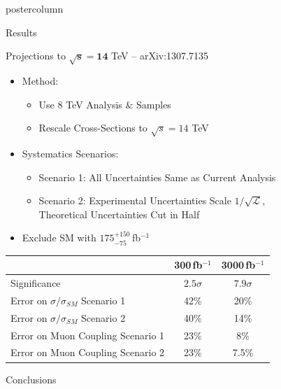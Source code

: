 \documentclass[final,hyperref={pdfpagelabels=false}]{beamer}
\newcommand{\fb}{\,fb$^{-1}$}
\begin{document}
\begin{frame}
\begin{columns}
\begin{column}{.49\textwidth}
\begin{beamercolorbox}[center,wd=\textwidth]{postercolumn}
\begin{minipage}[T]{.95\textwidth}
{\begin{block}{Results}
            \end{block}
            \vfill
            \begin{block}{Projections to $\mathbf{\sqrt{s}=14}$ TeV -- arXiv:1307.7135 }
               \begin{itemize} 
                  \item Method:
                  \begin{itemize} 
                    \item Use 8 TeV Analysis \& Samples 
                    \item Rescale Cross-Sections to $\sqrt{s}=14$ TeV
                  \end{itemize}
                  \item Systematics Scenarios:
                  \begin{itemize}
                    \item Scenario 1: All Uncertainties Same as Current Analysis
                    \item Scenario 2: Experimental Uncertainties Scale $1/\sqrt{\mathcal{L}}$, \\
                                      Theoretical Uncertainties Cut in Half
                  \end{itemize}
                  \item Exclude SM with $175^{+150}_{-75}$\fb
               \end{itemize}
               \begin{center}
                      \begin{tabular}{|l|c|c|} \hline
                          & 300\fb & 3000\fb \\ \hline
                        Significance  & $2.5\sigma$ & $7.9\sigma$ \\ \hline
                        Error on $\sigma/\sigma_{SM}$ Scenario 1  & 42\% & 20\% \\ \hline
                        Error on $\sigma/\sigma_{SM}$ Scenario 2  & 40\% & 14\% \\ \hline
                        Error on Muon Coupling Scenario 1  & 23\% & 8\% \\ \hline
                        Error on Muon Coupling Scenario 2  & 23\% & 7.5\% \\ \hline
                      \end{tabular}
               \end{center}
            \end{block}
            \vfill
            \begin{block}{Conclusions}

\end{block}}
\end{minipage}
\end{beamercolorbox}
\end{column}
\end{columns}
\end{frame}
\end{document}
